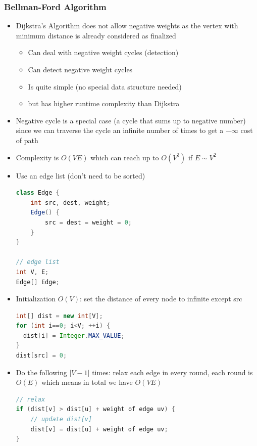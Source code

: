 \documentclass{article}
\begin{document}
\begin{multicols}{2}
\subsubsection{Bellman-Ford Algorithm}
\begin{itemize}
	\item Dijkstra's Algorithm does not allow negative weights as the vertex with minimum distance is already considered as finalized
	\begin{itemize}
		\item Can deal with negative weight cycles (detection)
		\item Can detect negative weight cycles
		\item Is quite simple (no special data structure needed)
		\item but has higher runtime complexity than Dijkstra
	\end{itemize}
	\item Negative cycle is a special case (a cycle that sums up to negative number) since we can traverse the cycle an infinite number of times to get a $- \infty$ cost of path
	\item Complexity is $O(VE)$ which can reach up to $O(V^3)$ if $E \sim V^2$
	\item Use an edge list (don't need to be sorted)
	\begin{lstlisting}[language=java]
class Edge {
	int src, dest, weight;
	Edge() {
		src = dest = weight = 0;
	}
}

// edge list
int V, E;
Edge[] Edge;
\end{lstlisting}
    \item Initialization $O(V)$: set the distance of every node to infinite except src
    \begin{lstlisting}[language=Java]
int[] dist = new int[V];
for (int i==0; i<V; ++i) {
  dist[i] = Integer.MAX_VALUE;
}
dist[src] = 0;
\end{lstlisting}
    \item Do the following $|V-1|$ times: relax each edge in every round, each round is $O(E)$ which means in total we have $O(VE)$
    \begin{lstlisting}[language=Java]
// relax
if (dist[v] > dist[u] + weight of edge uv) {
	// update dist[v]
	dist[v] = dist[u] + weight of edge uv;
}
\end{lstlisting}
\end{itemize}

\end{multicols}
\end{document}
